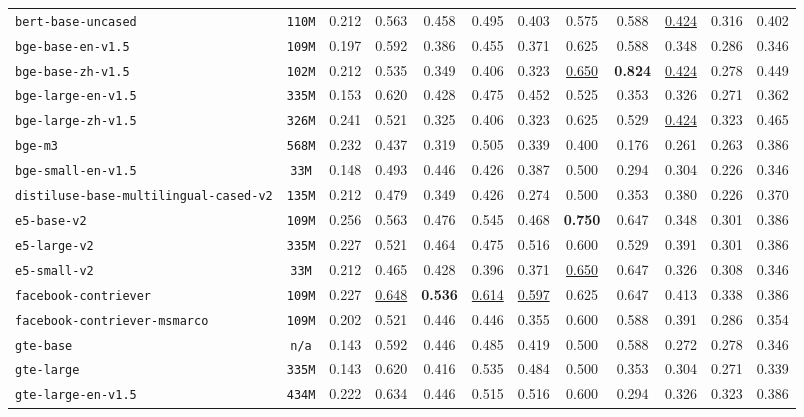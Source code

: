 \documentclass[11pt]{article}
\begin{document}
\begin{table}[htbp]
{\begin{tabular}{lccccccccccc}
\texttt{bert-base-uncased} & \texttt{110M} & 0.212 & 0.563 & 0.458 & 0.495 & 0.403 & 0.575 & 0.588 & \underline{0.424} & 0.316 & 0.402 \\
\texttt{bge-base-en-v1.5} & \texttt{109M} & 0.197 & 0.592 & 0.386 & 0.455 & 0.371 & 0.625 & 0.588 & 0.348 & 0.286 & 0.346 \\
\texttt{bge-base-zh-v1.5} & \texttt{102M} & 0.212 & 0.535 & 0.349 & 0.406 & 0.323 & \underline{0.650} & \textbf{0.824} & \underline{0.424} & 0.278 & 0.449 \\
\texttt{bge-large-en-v1.5} & \texttt{335M} & 0.153 & 0.620 & 0.428 & 0.475 & 0.452 & 0.525 & 0.353 & 0.326 & 0.271 & 0.362 \\
\texttt{bge-large-zh-v1.5} & \texttt{326M} & 0.241 & 0.521 & 0.325 & 0.406 & 0.323 & 0.625 & 0.529 & \underline{0.424} & 0.323 & 0.465 \\
\texttt{bge-m3} & \texttt{568M} & 0.232 & 0.437 & 0.319 & 0.505 & 0.339 & 0.400 & 0.176 & 0.261 & 0.263 & 0.386 \\
\texttt{bge-small-en-v1.5} & \texttt{33M} & 0.148 & 0.493 & 0.446 & 0.426 & 0.387 & 0.500 & 0.294 & 0.304 & 0.226 & 0.346 \\
\texttt{distiluse-base-multilingual-cased-v2} & \texttt{135M} & 0.212 & 0.479 & 0.349 & 0.426 & 0.274 & 0.500 & 0.353 & 0.380 & 0.226 & 0.370 \\
\texttt{e5-base-v2} & \texttt{109M} & 0.256 & 0.563 & 0.476 & 0.545 & 0.468 & \textbf{0.750} & 0.647 & 0.348 & 0.301 & 0.386 \\
\texttt{e5-large-v2} & \texttt{335M} & 0.227 & 0.521 & 0.464 & 0.475 & 0.516 & 0.600 & 0.529 & 0.391 & 0.301 & 0.386 \\
\texttt{e5-small-v2} & \texttt{33M} & 0.212 & 0.465 & 0.428 & 0.396 & 0.371 & \underline{0.650} & 0.647 & 0.326 & 0.308 & 0.346 \\
\texttt{facebook-contriever} & \texttt{109M} & 0.227 & \underline{0.648} & \textbf{0.536} & \underline{0.614} & \underline{0.597} & 0.625 & 0.647 & 0.413 & 0.338 & 0.386 \\
\texttt{facebook-contriever-msmarco} & \texttt{109M} & 0.202 & 0.521 & 0.446 & 0.446 & 0.355 & 0.600 & 0.588 & 0.391 & 0.286 & 0.354 \\
\texttt{gte-base} & \texttt{n/a} & 0.143 & 0.592 & 0.446 & 0.485 & 0.419 & 0.500 & 0.588 & 0.272 & 0.278 & 0.346 \\
\texttt{gte-large} & \texttt{335M} & 0.143 & 0.620 & 0.416 & 0.535 & 0.484 & 0.500 & 0.353 & 0.304 & 0.271 & 0.339 \\
\texttt{gte-large-en-v1.5} & \texttt{434M} & 0.222 & 0.634 & 0.446 & 0.515 & 0.516 & 0.600 & 0.294 & 0.326 & 0.323 & 0.386 \\

\end{tabular}}
\end{table}
\end{document}
